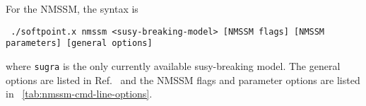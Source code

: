 \documentclass[final,3p,times,pdflatex]{elsarticle}
\def\code#1{\small{\tt #1}\normalsize}
\newcommand{\MSbar}{{\overline{MS}}}
\DeclareMathOperator{\sign}{sign}
\begin{document}
%
For the NMSSM, the syntax is
%
\small
\begin{verbatim}
 ./softpoint.x nmssm <susy-breaking-model> [NMSSM flags] [NMSSM parameters] [general options]
\end{verbatim}
\normalsize
%
where \code{sugra} is the only currently available susy-breaking
model.  The general options are listed in Ref.~\cite{Allanach:2001kg}
and the NMSSM flags and
parameter options are listed in
\tablename~\ref{tab:nmssm-cmd-line-options}.
%
\end{document}
